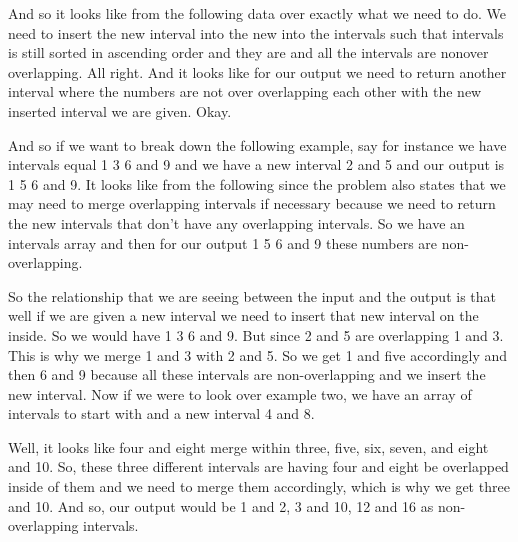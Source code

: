 \expandafter\def\csname sourceexcerpt@40\endcsname{%
And so it looks like from the following data over exactly what we need to do. We need
to insert the new interval into the new into the intervals such that intervals is
still sorted in ascending order and they are and all the intervals are nonover
overlapping. All right. And it looks like for our output we need to return another
interval where the numbers are not over overlapping each other with the new inserted
interval we are given. Okay.

And so if we want to break down the following example, say for instance we have
intervals equal 1 3 6 and 9 and we have a new interval 2 and 5 and our output is 1 5 6
and 9. It looks like from the following since the problem also states that we may need
to merge overlapping intervals if necessary because we need to return the new
intervals that don't have any overlapping intervals. So we have an intervals array and
then for our output 1 5 6 and 9 these numbers are non-overlapping.

So the relationship that we are seeing between the input and the output is that well
if we are given a new interval we need to insert that new interval on the inside. So
we would have 1 3 6 and 9. But since 2 and 5 are overlapping 1 and 3. This is why we
merge 1 and 3 with 2 and 5. So we get 1 and five accordingly and then 6 and 9 because
all these intervals are non-overlapping and we insert the new interval. Now if we
were to look over example two, we have an array of intervals to start with and a new
interval 4 and 8.

Well, it looks like four and eight merge within three, five, six, seven, and eight and
10. So, these three different intervals are having four and eight be overlapped inside
of them and we need to merge them accordingly, which is why we get three and 10. And
so, our output would be 1 and 2, 3 and 10, 12 and 16 as non-overlapping
intervals.
}

